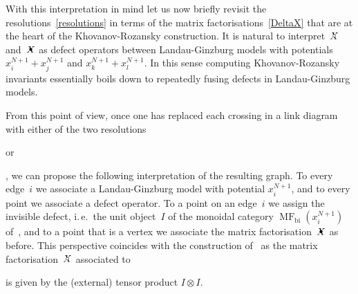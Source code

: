 \documentclass{compositio}
\theoremstyle{definition}
\numberwithin{equation}{section}
\begin{document}
With this interpretation in mind let us now briefly revisit the resolutions~\eqref{resolutions} in terms of the matrix factorisations~\eqref{DeltaX} that are at the heart of the Khovanov-Rozansky construction. It is natural to interpret~$\Xcirc$ and~$\Xbul$ as defect operators between Landau-Ginzburg models with potentials $x^{N+1}_{i}+x^{N+1}_{j}$ and $x^{N+1}_{k}+x^{N+1}_{l}$. In this sense computing Khovanov-Rozansky invariants essentially boils down to repeatedly fusing defects in Landau-Ginzburg models. 

From this point of view, once one has replaced each crossing in a link diagram with either of the two resolutions 
\begin{minipage}{0.36cm}
\end{minipage}
 or 
 \begin{minipage}{0.36cm}
\end{minipage}
, we can propose the following interpretation of the resulting graph. To every edge~$i$ we associate a Landau-Ginzburg model with potential $x_{i}^{N+1}$, and to every point we associate a defect operator. To a point on an edge~$i$ we assign the invisible defect, i.\,e.~the unit object~$I$ of the monoidal category $\operatorname{MF}_{\text{bi}}(x_{i}^{N+1})$ of~\cite{cr0909.4381}, and to a point that is a vertex we associate the matrix factorisation~$\Xbul$ as before. This perspective coincides with the construction of~\cite{kr0401268} as the matrix factorisation~$\Xcirc$ associated to 
\begin{minipage}{0.3cm}
\end{minipage}
 is given by the (external) tensor product $I\otimes I$. 
\end{document}
